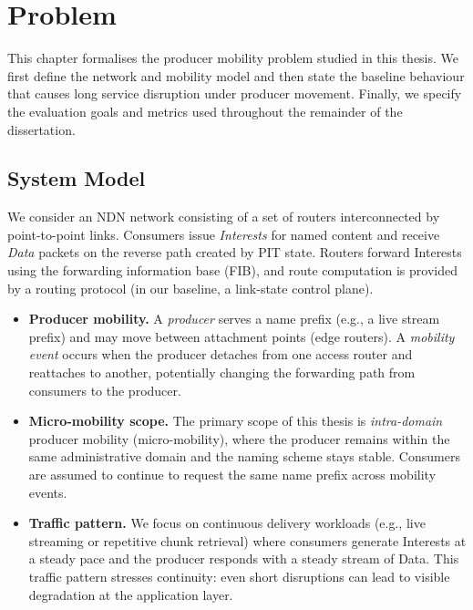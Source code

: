 \chapter{Problem}
\label{c:problem}

This chapter formalises the producer mobility problem studied in this thesis. We first define the network and mobility model and then state the baseline behaviour that causes long service disruption under producer movement. Finally, we specify the evaluation goals and metrics used throughout the remainder of the dissertation.


\section{System Model}
\label{sec:problem:system_model}

We consider an NDN network consisting of a set of routers interconnected by point-to-point links. Consumers issue \emph{Interests} for named content and receive \emph{Data} packets on the reverse path created by PIT state. Routers forward Interests using the forwarding information base (FIB), and route computation is provided by a routing protocol (in our baseline, a link-state control plane).

\begin{itemize}
    \item \textbf{Producer mobility.} A \emph{producer} serves a name prefix (e.g., a live stream prefix) and may move between attachment points (edge routers). A \emph{mobility event} occurs when the producer detaches from one access router and reattaches to another, potentially changing the forwarding path from consumers to the producer.
    \item \textbf{Micro-mobility scope.} The primary scope of this thesis is \emph{intra-domain} producer mobility (micro-mobility), where the producer remains within the same administrative domain and the naming scheme stays stable. Consumers are assumed to continue to request the same name prefix across mobility events.
    \item \textbf{Traffic pattern.} We focus on continuous delivery workloads (e.g., live streaming or repetitive chunk retrieval) where consumers generate Interests at a steady pace and the producer responds with a steady stream of Data. This traffic pattern stresses continuity: even short disruptions can lead to visible degradation at the application layer.
\end{itemize}

